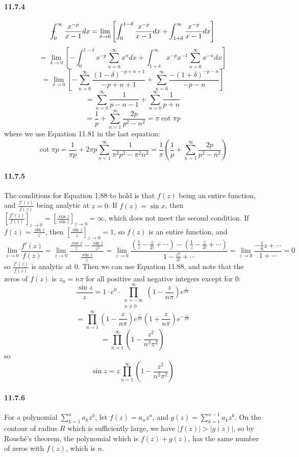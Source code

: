 \documentclass[a4paper]{article}
\begin{document}
\paragraph{11.7.4}
\[
\dashint_0^\infty\frac{x^{-p}}{x-1}dx=\lim_{\delta\to0}\left[\int_0^{1-\delta}\frac{x^{-p}}{x-1}dx+\int_{1+\delta}^\infty\frac{x^{-p}}{x-1}dx \right]
\]
\[
=\lim_{\delta\to0}\left[-\int_0^{1-\delta}x^{-p}\sum_{n=0}^\infty x^ndx+\int_{1+\delta}^\infty x^{-p}x^{-1}\sum_{n=0}^\infty x^{-n}dx \right]
\]
\[
=\lim_{\delta\to0}\left[-\sum_{n=0}^\infty\frac{(1-\delta)^{-p+n+1}}{-p+n+1}+\sum_{n=0}^\infty\frac{-(1+\delta)^{-p-n}}{-p-n} \right]
\]
\[
=\sum_{n=0}^\infty\frac{1}{p-n-1}+\sum_{n=0}^\infty\frac{1}{p+n}
\]
\[
=\frac{1}{p}+\sum_{n=1}^\infty\frac{2p}{p^2-n^2}=\pi\cot \pi p
\]
where we use Equation 11.81 in the last equation:
\[
\cot \pi p=\frac{1}{\pi p}+2\pi p\sum_{n=1}^\infty\frac{1}{\pi^2p^2-\pi^2n^2}=\frac{1}{\pi}\left(\frac{1}{p}+\sum_{n=1}^\infty\frac{2p}{p^2-n^2} \right)
\]

\paragraph{11.7.5}
The conditions for Equation 1.88 to hold is that $f(z)$ being an entire function, and $\frac{f'(z)}{f(z)}$ being analytic at $z=0$. If $f(z)=\sin x$, then $\left[\frac{f'(z)}{f(z)}\right]_{z\to0}=\left[\frac{\cos z}{\sin z}\right]_{z\to0}=\infty$, which does not meet the second condition. If $f(z)=\frac{\sin z}{z}$, then $\left[\frac{\sin z}{z}\right]_{z\to0}=1$, so $f(z)$ is an entire function, and \[
\lim_{z\to0}\frac{f'(z)}{f(z)}=\lim_{z\to0}\frac{\frac{\cos z}{z}-\frac{\sin z}{z^2}}{\frac{\sin z}{z}}=\lim_{z\to0}\frac{(\frac{1}{z}-\frac{z}{2!}+\cdots)-(\frac{1}{z}-\frac{z}{3!}+\cdots)}{1-\frac{z^2}{3!}+\cdots}=\lim_{z\to0}\frac{-\frac{1}{6}z+\cdots}{1+\cdots}=0
\]
so $\frac{f'(z)}{f(z)}$ is analytic at $0$. Then we can use Equation 11.88, and note that the zeros of $f(z)$ is $z_n=n\pi$ for all positive and negative integers except for $0$:
\[
\frac{\sin z}{z}=1\cdot e^{0}\cdot \prod_{\substack{n=-\infty\\n\neq0}}^\infty\left(1-\frac{z}{n\pi}\right)e^{\frac{z}{n\pi}}\]
\[=\prod_{n=1}^\infty\left(1-\frac{z}{n\pi}\right)e^{\frac{z}{n\pi}}\left(1+\frac{z}{n\pi}\right)e^{-\frac{z}{n\pi}}
\]
\[
=\prod_{n=1}^\infty\left(1-\frac{z^2}{n^2\pi^2}\right)
\]
so
\[
\sin z=z\prod_{n=1}^\infty\left(1-\frac{z^2}{n^2\pi^2}\right)
\]

\paragraph{11.7.6}
For a polynomial $\sum_{k=1}^n a_kz^k$, let $f(z)=a_nz^n$, and $g(z)=\sum_{k=1}^{n-1}a_kz^k$. On the contour of radius $R$ which is sufficiently large, we have $|f(z)|>|g(z)|$, so by Rouché’s theorem, the polynomial which is $f(z)+g(z)$, has the same number of zeros with $f(z)$, which is $n$. 
\end{document}
